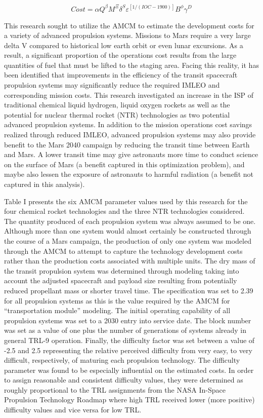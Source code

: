 \documentclass[]{aiaa-pretty}
\begin{document}
\[ Cost = \alpha Q^\beta M^\Xi \delta^S \varepsilon^{[1/(IOC-1900)]} B^\phi \gamma^D \]

This research sought to utilize the AMCM to estimate the development costs for a variety of advanced propulsion systems. Missions to Mars require a very large delta V compared to historical low earth orbit or even lunar excursions. As a result, a significant proportion of the operations cost results from the large quantities of fuel that must be lifted to the staging area. Facing this reality, it has been identified that improvements in the efficiency of the transit spacecraft propulsion systems may significantly reduce the required IMLEO and corresponding mission costs. This research investigated an increase in the ISP of traditional chemical liquid hydrogen, liquid oxygen rockets as well as the potential for nuclear thermal rocket (NTR) technologies as two potential advanced propulsion systems. In addition to the mission operations cost savings realized through reduced IMLEO, advanced propulsion systems may also provide benefit to the Mars 2040 campaign by reducing the transit time between Earth and Mars. A lower transit time may give astronauts more time to conduct science on the surface of Mars (a benefit captured in this optimization problem), and maybe also lessen the exposure of astronauts to harmful radiation (a benefit not captured in this analysis).

Table I presents the six AMCM parameter values used by this research for the four chemical rocket technologies and the three NTR technologies considered. The quantity produced of each propulsion system was always assumed to be one. Although more than one system would almost certainly be constructed through the course of a Mars campaign, the production of only one system was modeled through the AMCM to attempt to capture the technology development costs rather than the production costs associated with multiple units. The dry mass of the transit propulsion system was determined through modeling taking into account the adjusted spacecraft and payload size resulting from potentially reduced propellant mass or shorter travel time. The specification was set to 2.39 for all propulsion systems as this is the value required by the AMCM for “transportation module” modeling. The initial operating capability of all propulsion systems was set to a 2030 entry into service date. The block number was set as a value of one plus the number of generations of systems already in general TRL-9 operation. Finally, the difficulty factor was set between a value of -2.5 and 2.5 representing the relative perceived difficulty from very easy, to very difficult, respectively, of maturing each propulsion technology. The difficulty parameter was found to be especially influential on the estimated costs. In order to assign reasonable and consistent difficulty values, they were determined as roughly proportional to the TRL assignments from the NASA In-Space Propulsion Technology Roadmap where high TRL received lower (more positive) difficulty values and vice versa for low TRL. \cite{nasa2015techroadmap}
\end{document}
